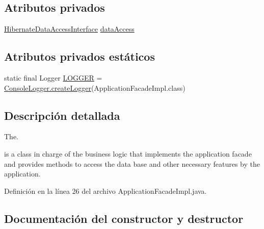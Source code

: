 \subsection*{Atributos privados}
\begin{DoxyCompactItemize}
\item 
\mbox{\hyperlink{a00148}{Hibernate\+Data\+Access\+Interface}} \mbox{\hyperlink{a00132_a96ac80fe606a4649e5fbbbd24935690a}{data\+Access}}
\end{DoxyCompactItemize}
\subsection*{Atributos privados estáticos}
\begin{DoxyCompactItemize}
\item 
static final Logger \mbox{\hyperlink{a00132_a4d2aed9fcae945d5ffaa63947bb56cde}{L\+O\+G\+G\+ER}} = \mbox{\hyperlink{a00220_a520321643663e37d95761134a35505cd}{Console\+Logger.\+create\+Logger}}(Application\+Facade\+Impl.\+class)
\end{DoxyCompactItemize}


\subsection{Descripción detallada}
The. 


\begin{DoxyCode}{0}
\end{DoxyCode}
 is a class in charge of the business logic that implements the application facade and provides methods to access the data base and other necessary features by the application. 

Definición en la línea 26 del archivo Application\+Facade\+Impl.\+java.



\subsection{Documentación del constructor y destructor}
\mbox{\label{a00132_ad6ed360c754c5ba82a2b88bb4cf036f7}} 
